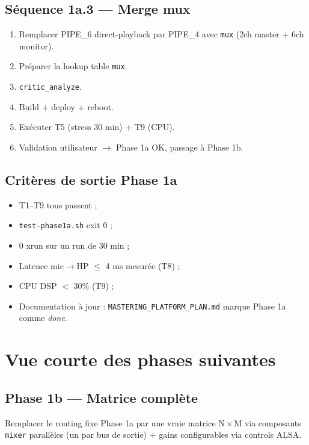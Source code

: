 \documentclass[11pt,a4paper]{article}
\begin{document}
\subsection{Séquence 1a.3 --- Merge mux}
\begin{enumerate}[leftmargin=*, itemsep=2pt]
  \item Remplacer PIPE\_6 direct-playback par PIPE\_4 avec \texttt{mux} (2ch master + 6ch monitor).
  \item Préparer la lookup table \texttt{mux}.
  \item \texttt{critic\_analyze}.
  \item Build + deploy + reboot.
  \item Exécuter T5 (stress 30 min) + T9 (CPU).
  \item Validation utilisateur $\rightarrow$ Phase 1a OK, passage à Phase 1b.
\end{enumerate}

\subsection{Critères de sortie Phase 1a}
\begin{itemize}[leftmargin=*, itemsep=1pt]
  \item T1--T9 tous passent ;
  \item \texttt{test-phase1a.sh} exit 0 ;
  \item 0 xrun sur un run de 30 min ;
  \item Latence mic$\rightarrow$HP $\leq$ 4 ms mesurée (T8) ;
  \item CPU DSP $<$ 30\% (T9) ;
  \item Documentation à jour : \texttt{MASTERING\_PLATFORM\_PLAN.md} marque Phase 1a comme \emph{done}.
\end{itemize}

\clearpage
\section{Vue courte des phases suivantes}

\subsection{Phase 1b --- Matrice complète}
Remplacer le routing fixe Phase 1a par une vraie matrice N\,$\times$\,M via composants \texttt{mixer} parallèles (un par bus de sortie) $+$ gains configurables via controls ALSA.
\end{document}
